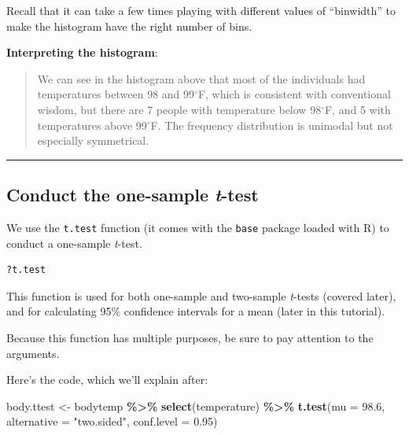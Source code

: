 \documentclass[
]{book}
\newenvironment{Shaded}{\begin{snugshade}}{\end{snugshade}}
\newcommand{\AttributeTok}[1]{\textcolor[rgb]{0.13,0.29,0.53}{#1}}
\newcommand{\FloatTok}[1]{\textcolor[rgb]{0.00,0.00,0.81}{#1}}
\newcommand{\FunctionTok}[1]{\textcolor[rgb]{0.13,0.29,0.53}{\textbf{#1}}}
\newcommand{\NormalTok}[1]{#1}
\newcommand{\OtherTok}[1]{\textcolor[rgb]{0.56,0.35,0.01}{#1}}
\newcommand{\SpecialCharTok}[1]{\textcolor[rgb]{0.81,0.36,0.00}{\textbf{#1}}}
\newcommand{\StringTok}[1]{\textcolor[rgb]{0.31,0.60,0.02}{#1}}
\begin{document}
Recall that it can take a few times playing with different values of ``binwidth'' to make the histogram have the right number of bins.

\textbf{Interpreting the histogram}:

\begin{quote}
We can see in the histogram above that most of the individuals had temperatures between 98 and 99\(^\circ\)F, which is consistent with conventional wisdom, but there are 7 people with temperature below 98\(^\circ\)F, and 5 with temperatures above 99\(^\circ\)F. The frequency distribution is unimodal but not especially symmetrical.
\end{quote}

\begin{center}\rule{0.5\linewidth}{0.5pt}\end{center}

\subsection{\texorpdfstring{Conduct the one-sample \emph{t}-test}{Conduct the one-sample t-test}}\label{onesamp_test}

We use the \texttt{t.test} function (it comes with the \texttt{base} package loaded with R) to conduct a one-sample \emph{t}-test.

\begin{verbatim}
?t.test  
\end{verbatim}

This function is used for both one-sample and two-sample \emph{t}-tests (covered later), and for calculating 95\% confidence intervals for a mean (later in this tutorial).

Because this function has multiple purposes, be sure to pay attention to the arguments.

Here's the code, which we'll explain after:

\begin{Shaded}
\begin{Highlighting}[]
\NormalTok{body.ttest }\OtherTok{\textless{}{-}}\NormalTok{ bodytemp }\SpecialCharTok{\%\textgreater{}\%}
  \FunctionTok{select}\NormalTok{(temperature) }\SpecialCharTok{\%\textgreater{}\%}
\FunctionTok{t.test}\NormalTok{(}\AttributeTok{mu =} \FloatTok{98.6}\NormalTok{, }\AttributeTok{alternative =} \StringTok{"two.sided"}\NormalTok{, }\AttributeTok{conf.level =} \FloatTok{0.95}\NormalTok{) }
\end{Highlighting}
\end{Shaded}
\end{document}
